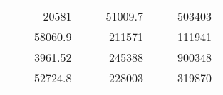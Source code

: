 \begin{table}[H]
\begin{tabular}{|ccrccrccc}
\rowcolor[HTML]{DDFDFF} 
\multicolumn{1}{|c|}{\cellcolor[HTML]{FFFFC7}}                                & \multicolumn{1}{c|}{\cellcolor[HTML]{DDFDFF}}                      & \multicolumn{1}{r|}{\cellcolor[HTML]{DAE8FC}20581}     & \multicolumn{1}{c|}{\cellcolor[HTML]{FFFFC7}}                                & \multicolumn{1}{c|}{\cellcolor[HTML]{DDFDFF}}                       & \multicolumn{1}{r|}{\cellcolor[HTML]{DDFDFF}51009.7}   & \multicolumn{1}{c|}{\cellcolor[HTML]{FFFFC7}}                                & \multicolumn{1}{c|}{\cellcolor[HTML]{DDFDFF}}                      & \multicolumn{1}{r|}{\cellcolor[HTML]{DDFDFF}503403}    \\ \cline{3-3} \cline{6-6} \cline{9-9} 
\multicolumn{1}{|c|}{\cellcolor[HTML]{FFFFC7}}                                & \multicolumn{1}{c|}{\cellcolor[HTML]{DDFDFF}}                      & \multicolumn{1}{r|}{\cellcolor[HTML]{DDFDFF}58060.9}   & \multicolumn{1}{c|}{\cellcolor[HTML]{FFFFC7}}                                & \multicolumn{1}{c|}{\cellcolor[HTML]{DDFDFF}}                       & \multicolumn{1}{r|}{\cellcolor[HTML]{DAE8FC}211571}    & \multicolumn{1}{c|}{\cellcolor[HTML]{FFFFC7}}                                & \multicolumn{1}{c|}{\cellcolor[HTML]{DDFDFF}}                      & \multicolumn{1}{r|}{\cellcolor[HTML]{DAE8FC}111941}    \\ \cline{3-3} \cline{6-6} \cline{9-9} 
\rowcolor[HTML]{DDFDFF} 
\multicolumn{1}{|c|}{\cellcolor[HTML]{FFFFC7}}                                & \multicolumn{1}{c|}{\cellcolor[HTML]{DDFDFF}}                      & \multicolumn{1}{r|}{\cellcolor[HTML]{DAE8FC}3961.52}   & \multicolumn{1}{c|}{\cellcolor[HTML]{FFFFC7}}                                & \multicolumn{1}{c|}{\cellcolor[HTML]{DDFDFF}}                       & \multicolumn{1}{r|}{\cellcolor[HTML]{DDFDFF}245388}    & \multicolumn{1}{c|}{\cellcolor[HTML]{FFFFC7}}                                & \multicolumn{1}{c|}{\cellcolor[HTML]{DDFDFF}}                      & \multicolumn{1}{r|}{\cellcolor[HTML]{DDFDFF}900348}    \\ \cline{3-3} \cline{6-6} \cline{9-9} 
\multicolumn{1}{|c|}{\cellcolor[HTML]{FFFFC7}}                                & \multicolumn{1}{c|}{\cellcolor[HTML]{DDFDFF}}                      & \multicolumn{1}{r|}{\cellcolor[HTML]{DDFDFF}52724.8}   & \multicolumn{1}{c|}{\cellcolor[HTML]{FFFFC7}}                                & \multicolumn{1}{c|}{\cellcolor[HTML]{DDFDFF}}                       & \multicolumn{1}{r|}{\cellcolor[HTML]{DAE8FC}228003}    & \multicolumn{1}{c|}{\cellcolor[HTML]{FFFFC7}}                                & \multicolumn{1}{c|}{\cellcolor[HTML]{DDFDFF}}                      & \multicolumn{1}{r|}{\cellcolor[HTML]{DAE8FC}319870}    \\ \cline{3-3} \cline{6-6} \cline{9-9} 

\end{tabular}
\end{table}
